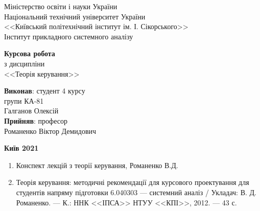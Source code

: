 


\begin{titlepage}
    \thispagestyle{empty}
    \begin{center}
        Міністерство освіти і науки України\\
        Національний технічний університет України\\
        <<Київський політехнічний інститут ім. І. Сікорського>>\\
        Інститут прикладного системного аналізу
    \end{center}
    \vspace{50mm}
    \begin{center}
        \textbf{Курсова робота} \\
        з дисципліни \\
        <<Теорія керування>>
    \end{center}
    \vspace{30mm}
    \begin{flushright}
        \textbf{Виконав}: студент 4 курсу \\
        групи КА-81 \\
        Галганов Олексій \\
        \textbf{Прийняв}: професор \\
        Романенко Віктор Демидович
    \end{flushright}
    \vspace{40mm}
    \begin{center}
        \textbf{Київ 2021}
    \end{center}
\end{titlepage}
\tableofcontents
{}
    
    \newpage
    
    \newpage
    
    \newpage
    
    \newpage
    
    \newpage
    
    \newpage
    
    \newpage
    
    \newpage
    
    \newpage

    \bibsection
    \begin{enumerate}
        \item Конспект лекцій з теорії керування, Романенко В.Д.
        \item Теорія керування: методичні рекомендації для курсового проектування для 
        студентів напряму підготовки 6.040303 –-- системний аналіз / Укладач: В. Д. Романенко. ---
        К.: ННК <<ІПСА>> НТУУ <<КПІ>>, 2012. --- 43 с.
    \end{enumerate}
